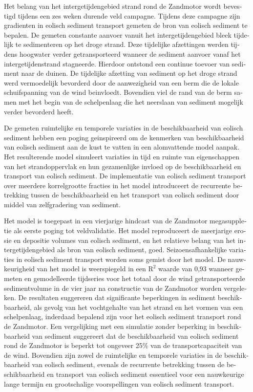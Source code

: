 \begin{otherlanguage}{dutch}
Het belang van het intergetijdengebied strand rond de Zandmotor wordt
bevestigd tijdens een zes weken durende veld campagne. Tijdens deze
campagne zijn gradi{\:e}nten in eolisch sediment transport gemeten de
bron van eolisch sediment te bepalen. De gemeten constante aanvoer
vanuit het intergetijdengebied bleek tijdelijk te sedimenteren op het
droge strand. Deze tijdelijke afzettingen werden tijdens hoogwater
verder getransporteerd wanneer de sediment aanvoer vanaf het
intergetijdenstrand stagneerde. Hierdoor ontstond een continue toevoer
van sediment naar de duinen. De tijdelijke afzetting van sediment op
het droge strand werd vermoedelijk bevorderd door de aanwezigheid van
een berm die de lokale schuifspanning van de wind
be{\:i}nvloedt. Bovendien viel de rand van de berm samen met het begin
van de schelpenlaag die het neerslaan van sediment mogelijk verder
bevorderd heeft.

De gemeten ruimtelijke en temporele variaties in de beschikbaarheid
van eolisch sediment hebben een poging ge{\:i}nspireerd om de
kenmerken van beschikbaarheid van eolisch sediment aan de kust te
vatten in een alomvattende model aanpak. Het resulterende model
simuleert variaties in tijd en ruimte van eigenschappen van het
strandoppervlak en hun gezamenlijke invloed op de beschikbaarheid en
transport van eolisch sediment. De implementatie van eolisch sediment
transport over meerdere korrelgrootte fracties in het model
introduceert de recurrente betrekking tussen de beschikbaarheid en het
transport van eolisch sediment door middel van zelfgradering van
sediment.

Het model is toegepast in een vierjarige hindcast van de Zandmotor
megasuppletie als eerste poging tot veldvalidatie. Het model
reproduceert de meerjarige erosie en depositie volumes van eolisch
sediment, en het relatieve belang van het intergetijdengebied als bron
van eolisch sediment, goed. Seizoensafhankelijke variaties in eolisch
sediment transport worden soms gemist door het model. De
nauwkeurigheid van het model is weerspiegeld in een $\mathrm{R^2}$
waarde van 0,93 wanneer gemeten en gemodelleerde tijdseries voor het
totaal door de wind getransporteerde sedimentvolume in de vier jaar na
constructie van de Zandmotor worden vergeleken. De resultaten
suggereren dat significante beperkingen in sediment beschikbaarheid,
als gevolg van het vochtgehalte van het strand en het vormen van een
schelpenlaag, inderdaad bepalend zijn voor het eolisch sediment
transport rond de Zandmotor. Een vergelijking met een simulatie zonder
beperking in beschikbaarheid van sediment suggereert dat de
beschikbaarheid van eolisch sediment rond de Zandmotor is beperkt tot
ongeveer 25\% van de transportcapaciteit van de wind. Bovendien zijn
zowel de ruimtelijke en temporele variaties in de beschikbaarheid van
eolisch sediment, evenals de recurrente betrekking tussen de
beschikbaarheid en transport van eolisch sediment essentieel voor een
nauwkeurige lange termijn en grootschalige voorspellingen van eolisch
sediment transport.
\end{otherlanguage}


